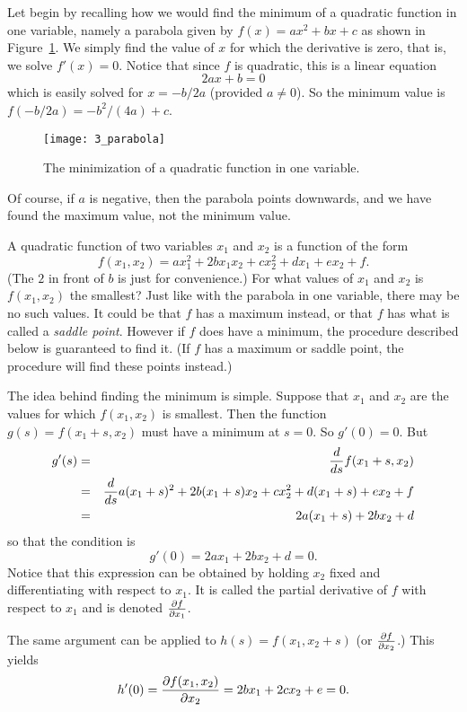 Let begin by recalling how we would find the minimum of a quadratic function in
one variable, namely a parabola given by $f(x) = a x^2 + bx + c$ as
shown in Figure~\ref{fig_parabola}. We simply find
the value of $x$ for which the derivative is zero, that is, we solve $f'(x)=0$.
Notice that since $f$ is quadratic, this is a linear equation
\[
2ax+b=0
\]
which is easily solved for $x=-b/2a$ (provided $a\ne 0$). 
So the minimum value is $f(-b/2a) = -b^2/(4a) + c$.

\begin{figure}
\centerline{\texttt{[image: 3\_parabola]}}
\caption{The minimization of a quadratic function in one variable. 
\label{fig_parabola}}
\end{figure}

Of course, if $a$ is negative, then the parabola points downwards, and
we have found the maximum value, not the minimum value.

A quadratic function of two variables $x_1$ and $x_2$ is a function of the
form
\[
f(x_1,x_2)= ax_1^2 + 2bx_1x_2 + cx_2^2 + dx_1 + ex_2+f.
\]
(The $2$ in front of $b$ is just for convenience.) For what values of
$x_1$ and $x_2$ is $f(x_1,x_2)$ the smallest? Just like with the parabola in
one variable, there may be no such values. It could be that $f$ has a maximum
instead, or that $f$ has what is called a {\em saddle point}. However if $f$ does have
a minimum, the procedure described below is guaranteed to find it. (If $f$
has a maximum or saddle point, the procedure will find these points instead.)

The idea behind finding the minimum is simple. Suppose that $x_1$ and
$x_2$ are the values for which $f(x_1,x_2)$ is smallest. Then the function
$g(s) = f(x_1+s,x_2)$ must have a minimum at $s=0$. So $g'(0)=0$. But
\begin{eqnarray*}
g'(s) &=& {{d}\over{ds}}f(x_1+s,x_2) \\
&=&{{d}\over{ds}}a(x_1+s)^2 + 2b(x_1+s)x_2 + cx_2^2 +
d(x_1+s) + ex_2+f \\
&=& 2a(x_1+s) + 2bx_2 + d
\end{eqnarray*}
so that the condition is
\[
g'(0) = 2ax_1 + 2bx_2 + d = 0.
\]
Notice that this expression can be obtained by holding $x_2$ fixed and
differentiating with respect to $x_1$. It is called the partial derivative of
$f$ with respect to $x_1$ and is denoted ${{\partial f}\over{\partial x_1}}$.

The same argument can be applied to $h(s)=f(x_1,x_2+s)$ (or 
${{\partial f}\over{\partial x_2}}$.)
This yields
\[
h'(0) = {{\partial f(x_1,x_2)}\over{\partial x_2}} = 2bx_1 + 2cx_2 + e = 0.
\]

